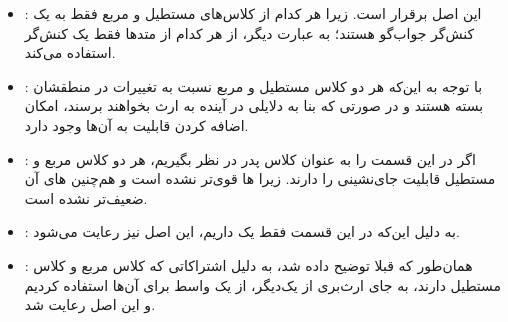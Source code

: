 \newpage
{}

\begin{itemize}
	\item \textbf{}: این اصل برقرار است. زیرا هر کدام از کلاس‌های مستطیل و مربع فقط به یک کنش‌گر جواب‌گو هستند؛ به عبارت دیگر، از هر کدام از متدها فقط یک کنش‌گر استفاده می‌کند. 
	\item \textbf{}: با توجه به این‌که هر دو کلاس مستطیل و مربع نسبت به تغییرات در منطقشان بسته هستند و در صورتی که بنا به دلایلی در آینده به ارث بخواهند برسند، امکان اضافه کردن قابلیت به آن‌ها وجود دارد.
	\item \textbf{}: اگر در این قسمت  را به عنوان کلاس پدر در نظر بگیریم، هر دو کلاس مربع و مستطیل قابلیت جای‌نشینی را دارند. زیرا ها قوی‌تر نشده است و هم‌چنین های آن ضعیف‌تر نشده است.
	\item \textbf{}: به دلیل این‌که در این قسمت فقط یک  داریم، این اصل نیز رعایت می‌شود.
	\item \textbf{}: همان‌طور که قبلا توضیح داده شد، به دلیل اشتراکاتی که کلاس مربع و کلاس مستطیل دارند، به جای ارث‌بری از یک‌دیگر، از یک واسط برای آن‌ها استفاده کردیم و این اصل رعایت شد.
\end{itemize}
